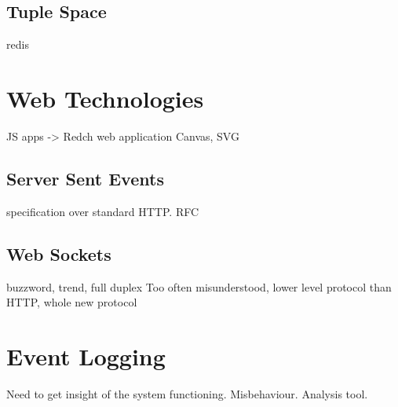 \subsection{Tuple Space}
redis

\section{Web Technologies}
JS apps -> Redch web application 
Canvas, SVG

\subsection{Server Sent Events}
specification over standard HTTP. RFC

\subsection{Web Sockets}
buzzword, trend, full duplex
Too often misunderstood, lower level protocol than HTTP, whole new protocol

\section{Event Logging}
Need to get insight of the system functioning. Misbehaviour. Analysis tool.